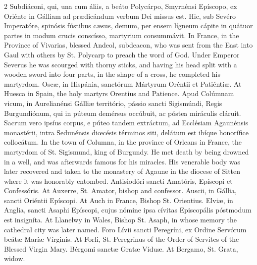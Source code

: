 \begin{paracol}{2}
 Subdiáconi, qui, una cum áliis, a beáto Polycárpo, Smyrnénsi Epíscopo, ex 
 Oriénte in Gálliam ad prædicándum verbum Dei missus est. Hic, sub 
 Sevéro Imperatóre, spinósis fústibus cæsus, demum, per ensem lígneum cápite 
 in quátuor partes in modum crucis conscísso, martyrium consummávit.
\switchcolumn
{}
In France, in the Province of Vivarias, blessed Andeol, 
 subdeacon, who was sent from the East into Gaul with others by St. Polycarp 
 to preach the word of God. Under Emperor Severus he was scourged with 
 thorny sticks, and having his head split with a wooden sword into four 
 parts, in the shape of a cross, he completed his martyrdom.
\switchcolumn*
{}
Oscæ, in Hispánia, sanctórum Mártyrum Oréntii et 
 Patiéntiæ.
\switchcolumn
{}
At Huesca in Spain, the holy martyrs Orentius and 
 Patience.
\switchcolumn*
{}
Apud Colúmnam vicum, in Aurelianénsi Gálliæ território, 
 pássio sancti Sigismúndi, Regis Burgundiónum, qui in púteum demérsus 
 occúbuit, ac póstea miráculis cláruit. Sacrum vero ipsíus corpus, e 
 púteo tandem extráctum, ad Ecclésiam Agaunénsis monastérii, intra Sedunénsis 
 diœcésis términos siti, delátum est ibíque honorífice collocátum.
\switchcolumn
{}
In the town of Columna, in the province of Orleans in 
 France, the martyrdom of St. Sigismund, king of Burgundy. He met death 
 by being drowned in a well, and was afterwards famous for his miracles. 
 His venerable body was later recovered and taken to the monastery of Agaune 
 in the diocese of Sitten where it was honorably entombed.
\switchcolumn*
{}
Antisiodóri sancti Amatóris, Epíscopi et Confessóris.
\switchcolumn
{}
At Auxerre, St. Amator, bishop and confessor.
\switchcolumn*
{}
Auscii, in Gállia, sancti Oriéntii Epíscopi.
\switchcolumn
{}
At Auch in France, Bishop St. Orientius.
\switchcolumn*
{}
Elviæ, in Anglia, sancti Asaphi Epíscopi, cujus nómine 
 ipsa cívitas Episcopális póstmodum est insigníta.
\switchcolumn
{}
At Llanelwy in Wales, Bishop St. Asaph, in whose memory 
 the cathedral city was later named.
\switchcolumn*
{}
Foro Lívii sancti Peregríni, ex Ordine Servórum beátæ 
 Maríæ Vírginis.
\switchcolumn
{}
At Forli, St. Peregrinus of the Order of Servites of the 
 Blessed Virgin Mary.
\switchcolumn*
{}
Bérgomi sanctæ Gratæ 
 Víduæ.
\switchcolumn
{}
At Bergamo, St. Grata, widow.
\switchcolumn*
{}
\end{paracol}

